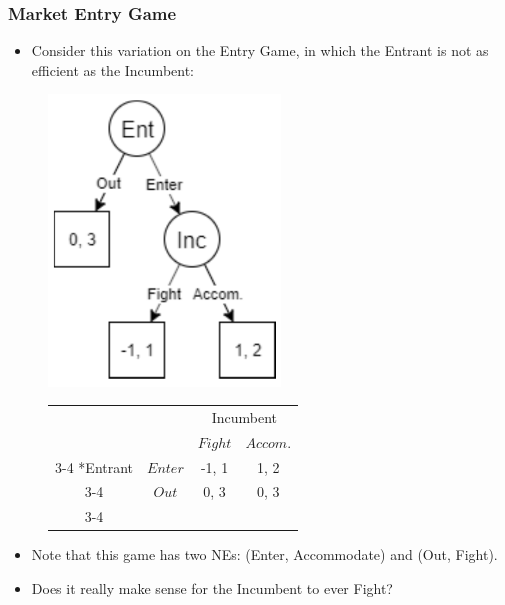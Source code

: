 
\begin{frame}
\frametitle{Market Entry Game}
\begin{itemize}
\item Consider this variation on the Entry Game, in which the Entrant is not as efficient as the Incumbent:
\end{itemize}
\begin{figure}
	\begin{minipage}{0.49\linewidth}
		\centering
		\includegraphics[width=0.55\textwidth]{figures/08InferiorEntrant.png}
	\end{minipage}
	\begin{minipage}{0.49\linewidth}
		\begin{tabular}{cc|c|c|}
			& \multicolumn{1}{c}{} & \multicolumn{2}{c}{Incumbent}\\
			& \multicolumn{1}{c}{} & \multicolumn{1}{c}{$Fight$}  & \multicolumn{1}{c}{$Accom.$} \\\cline{3-4}
			\multirow{2}*{Entrant}  & $Enter$ & -1, 1 & 1, 2 \\\cline{3-4}
			& $Out$ & 0, 3 & 0, 3 \\\cline{3-4}
		\end{tabular}
	\end{minipage}
\end{figure}
\begin{itemize}
\item Note that this game has two NEs: (Enter, Accommodate) and (Out, Fight). 
\item Does it really make sense for the Incumbent to ever Fight?
\end{itemize}
\end{frame}

